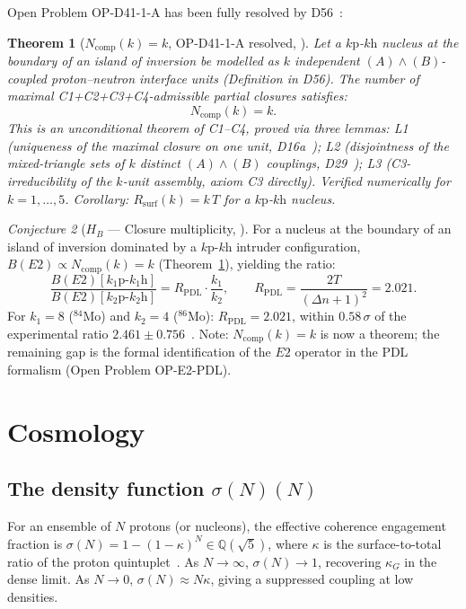 \documentclass[11pt,a4paper]{article}
\theoremstyle{plain}
\newtheorem{theorem}{Theorem}[section]
\theoremstyle{definition}
\theoremstyle{remark}
\newtheorem{conjecture}[theorem]{Conjecture}
\newcommand{\sigmaN}{\sigma(N)}
\begin{document}
Open Problem OP-D41-1-A has been fully resolved by D56~\cite{D56}:

\begin{theorem}[$N_{\mathrm{comp}}(k)=k$, OP-D41-1-A resolved, \cite{D56}]
\label{thm:Ncomp}
Let a $k\mathrm{p}$-$k\mathrm{h}$ nucleus at the boundary of an island of inversion be modelled as $k$ independent $(A)\wedge(B)$-coupled proton--neutron interface units (Definition in D56). The number of maximal C1+C2+C3+C4-admissible partial closures satisfies:
\begin{equation}
  N_{\mathrm{comp}}(k) = k.
\end{equation}
This is an unconditional theorem of C1--C4, proved via three lemmas: \emph{L1} (uniqueness of the maximal closure on one unit, D16a~\cite{D16a}); \emph{L2} (disjointness of the mixed-triangle sets of $k$ distinct $(A)\wedge(B)$ couplings, D29~\cite{D29}); \emph{L3} (C3-irreducibility of the $k$-unit assembly, axiom C3 directly). Verified numerically for $k=1,\ldots,5$. Corollary: $R_{\mathrm{surf}}(k)=k\,T$ for a $k\mathrm{p}$-$k\mathrm{h}$ nucleus.
\end{theorem}

\begin{conjecture}[$H_B$ --- Closure multiplicity, \cite{D41}]
\label{conj:HB}
For a nucleus at the boundary of an island of inversion dominated by a $k\mathrm{p}$-$k\mathrm{h}$ intruder configuration, $B(E2)\propto N_{\mathrm{comp}}(k)=k$ (Theorem~\ref{thm:Ncomp}), yielding the ratio:
\begin{equation}
  \frac{B(E2)[k_1\mathrm{p}\text{-}k_1\mathrm{h}]}{B(E2)[k_2\mathrm{p}\text{-}k_2\mathrm{h}]}
  = R_{\mathrm{PDL}}\cdot\frac{k_1}{k_2},
  \qquad R_{\mathrm{PDL}} = \frac{2T}{(\Delta n+1)^2} = 2.021.
\end{equation}
For $k_1=8$ ($^{84}$Mo) and $k_2=4$ ($^{86}$Mo): $R_{\mathrm{PDL}}=2.021$, within $0.58\,\sigma$ of the experimental ratio $2.461\pm0.756$~\cite{Ha2025}. Note: $N_{\mathrm{comp}}(k)=k$ is now a theorem; the remaining gap is the formal identification of the $E2$ operator in the PDL formalism (Open Problem OP-E2-PDL).
\end{conjecture}

\section{Cosmology}
\label{sec:cosmology}

\subsection{The density function \texorpdfstring{$\sigmaN(N)$}{sigmaN(N)}}
\label{subsec:sigma}
For an ensemble of $N$ protons (or nucleons), the effective coherence engagement fraction is $\sigmaN=1-(1-\kappa)^N\in\mathbb{Q}(\sqrt{5})$, where $\kappa$ is the surface-to-total ratio of the proton quintuplet~\cite{D24,D26}. As $N\to\infty$, $\sigmaN\to 1$, recovering $\kappa_G$ in the dense limit. As $N\to0$, $\sigmaN\approx N\kappa$, giving a suppressed coupling at low densities.
\end{document}
